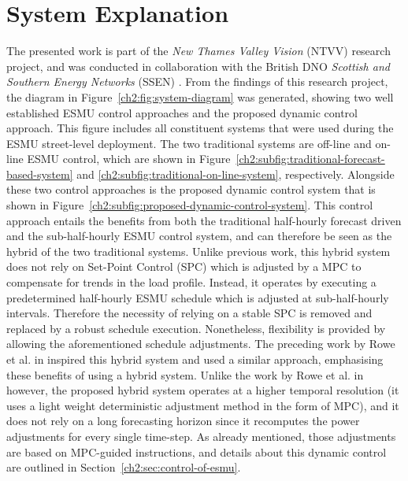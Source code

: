 \section{System Explanation}
\label{ch2:sec:system-explanation}



The presented work is part of the \textit{New Thames Valley Vision} (NTVV) research project, and was conducted in collaboration with the British DNO \textit{Scottish and Southern Energy Networks} (SSEN) \cite{NTVV2016}.
From the findings of this research project, the diagram in Figure~\ref{ch2:fig:system-diagram} was generated, showing two well established ESMU control approaches and the proposed dynamic control approach.
This figure includes all constituent systems that were used during the ESMU street-level deployment.
The two traditional systems are off-line and on-line ESMU control, which are shown in Figure~\ref{ch2:subfig:traditional-forecast-based-system} and \ref{ch2:subfig:traditional-on-line-system}, respectively.
Alongside these two control approaches is the proposed dynamic control system that is shown in Figure~\ref{ch2:subfig:proposed-dynamic-control-system}.
This control approach entails the benefits from both the traditional half-hourly forecast driven and the sub-half-hourly ESMU control system, and can therefore be seen as the hybrid of the two traditional systems.
Unlike previous work, this hybrid system does not rely on Set-Point Control (SPC) which is adjusted by a MPC to compensate for trends in the load profile.
Instead, it operates by executing a predetermined half-hourly ESMU schedule which is adjusted at sub-half-hourly intervals.
Therefore the necessity of relying on a stable SPC is removed and replaced by a robust schedule execution.
Nonetheless, flexibility is provided by allowing the aforementioned schedule adjustments.
The preceding work by Rowe et al. in \cite{Rowe2014} inspired this hybrid system and used a similar approach, emphasising these benefits of using a hybrid system.
Unlike the work by Rowe et al. in \cite{Rowe2014} however, the proposed hybrid system operates at a higher temporal resolution (it uses a light weight deterministic adjustment method in the form of MPC), and it does not rely on a long forecasting horizon since it recomputes the power adjustments for every single time-step.
As already mentioned, those adjustments are based on MPC-guided instructions, and details about this dynamic control are outlined in Section~\ref{ch2:sec:control-of-esmu}.

